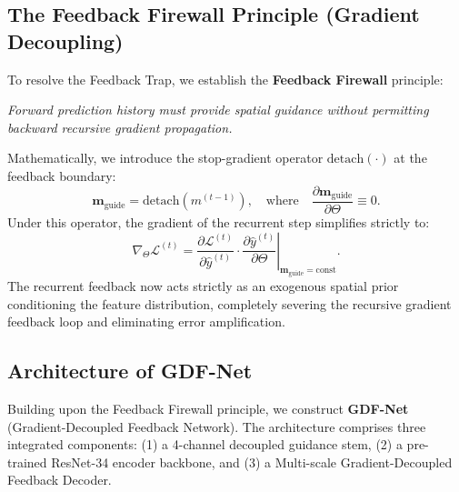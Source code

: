 \subsection{The Feedback Firewall Principle (Gradient Decoupling)}
To resolve the Feedback Trap, we establish the \textbf{Feedback Firewall} principle:
\begin{center}
  \textit{Forward prediction history must provide spatial guidance without permitting backward recursive gradient propagation.}
\end{center}
Mathematically, we introduce the stop-gradient operator $\text{detach}(\cdot)$ at the feedback boundary:
\begin{equation}
  \mathbf{m}_{\text{guide}} = \text{detach}\left(m^{(t-1)}\right), \quad \text{where} \quad \frac{\partial \mathbf{m}_{\text{guide}}}{\partial \Theta} \equiv 0.
\end{equation}
Under this operator, the gradient of the recurrent step simplifies strictly to:
\begin{equation}
  \nabla_\Theta \mathcal{L}^{(t)} = \frac{\partial \mathcal{L}^{(t)}}{\partial \hat{y}^{(t)}} \cdot \left. \frac{\partial \hat{y}^{(t)}}{\partial \Theta} \right|_{\mathbf{m}_{\text{guide}} = \text{const}}.
\end{equation}
The recurrent feedback now acts strictly as an exogenous spatial prior conditioning the feature distribution, completely severing the recursive gradient feedback loop and eliminating error amplification.

\subsection{Architecture of GDF-Net}
Building upon the Feedback Firewall principle, we construct \textbf{GDF-Net} (Gradient-Decoupled Feedback Network). The architecture comprises three integrated components: (1) a 4-channel decoupled guidance stem, (2) a pre-trained ResNet-34 encoder backbone, and (3) a Multi-scale Gradient-Decoupled Feedback Decoder.



